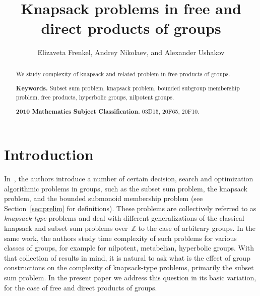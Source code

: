 \documentclass[10pt]{amsart}
\title{Knapsack problems in free and direct products of groups}
\author[]{Elizaveta Frenkel, Andrey Nikolaev, and Alexander Ushakov}
\theoremstyle{definition}
\begin{document}
\begin{abstract}
We study complexity of knapsack and related problem in free products of groups.

\noindent
{\bf Keywords.} Subset sum problem,  knapsack problem, bounded subgroup membership problem, free products, hyperbolic groups, nilpotent groups.

\noindent
{\bf 2010 Mathematics Subject Classification.} 03D15, 20F65, 20F10.
\end{abstract}
\maketitle

\tableofcontents

\section{Introduction}\label{sec:intro}


In~\cite{Miasnikov-Nikolaev-Ushakov:2014a}, the authors introduce a number of certain decision, search and optimization algorithmic problems in groups, such as the subset sum problem, the knapsack problem, and the bounded submonoid membership problem (see Section~\ref{sec:prelim} for definitions). These problems are collectively referred to as {\em knapsack-type} problems and deal with different generalizations of the classical knapsack and subset sum problems over~$\mathbb Z$ to the case of arbitrary groups. In the same work, the authors study time complexity of such problems for various classes of groups, for example for nilpotent, metabelian, hyperbolic groups. With that collection of results in mind, it is natural to ask what is the effect of group constructions on the complexity of knapsack-type problems, primarily the subset sum problem. In the present paper we address this question in its basic variation, for the case of free and direct products of groups.
\end{document}
